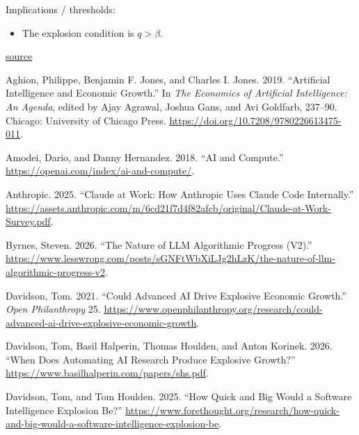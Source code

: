 \documentclass[
  11pt,
  letterpaper,
  DIV=11,
  numbers=noendperiod]{scrartcl}
\newlength{\cslhangindent}
\newenvironment{CSLReferences}[2] %
 {\begin{list}{}{%
  \setlength{\itemindent}{0pt}
  \setlength{\leftmargin}{0pt}
  \setlength{\parsep}{0pt}
  \ifodd #1
   \setlength{\leftmargin}{\cslhangindent}
   \setlength{\itemindent}{-1\cslhangindent}
  \fi
  \setlength{\itemsep}{#2\baselineskip}}}
 {\end{list}}
\providecommand{\tightlist}{%
  \setlength{\itemsep}{0pt}\setlength{\parskip}{0pt}}
\begin{document}
Implications / thresholds:

\begin{itemize}
\tightlist
\item
  The explosion condition is \(q > \beta\).
\end{itemize}

\href{https://docs.google.com/document/d/16Ugl7g3GL1Ao9-3UluRENp6e9UeEMAqhh5jgXDi3kjo/edit?tab=t.a5tu3xadb63o\#heading=h.ribcf6q6wbps}{source}

\label{refs}
\begin{CSLReferences}{1}{0}
Aghion, Philippe, Benjamin F. Jones, and Charles I. Jones. 2019.
{``Artificial Intelligence and Economic Growth.''} In \emph{The
Economics of Artificial Intelligence: An Agenda}, edited by Ajay
Agrawal, Joshua Gans, and Avi Goldfarb, 237--90. Chicago: University of
Chicago Press. \url{https://doi.org/10.7208/9780226613475-011}.

Amodei, Dario, and Danny Hernandez. 2018. {``AI and Compute.''}
\url{https://openai.com/index/ai-and-compute/}.

Anthropic. 2025. {``Claude at Work: How Anthropic Uses Claude Code
Internally.''}
\url{https://assets.anthropic.com/m/6cd21f7d4f82afcb/original/Claude-at-Work-Survey.pdf}.

Byrnes, Steven. 2026. {``The Nature of {LLM} Algorithmic Progress
(V2).''}
\url{https://www.lesswrong.com/posts/sGNFtWbXiLJg2hLzK/the-nature-of-llm-algorithmic-progress-v2}.

Davidson, Tom. 2021. {``Could Advanced AI Drive Explosive Economic
Growth.''} \emph{Open Philanthropy} 25.
\url{https://www.openphilanthropy.org/research/could-advanced-ai-drive-explosive-economic-growth}.

Davidson, Tom, Basil Halperin, Thomas Houlden, and Anton Korinek. 2026.
{``When Does Automating AI Research Produce Explosive Growth?''}
\url{https://www.basilhalperin.com/papers/shs.pdf}.

Davidson, Tom, and Tom Houlden. 2025. {``How Quick and Big Would a
Software Intelligence Explosion Be?''}
\url{https://www.forethought.org/research/how-quick-and-big-would-a-software-intelligence-explosion-be}.


\end{CSLReferences}
\end{document}
